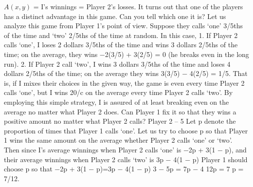 $A(x, y)$ = I’s winnings = Player 2’s losses.
It turns out that one of the players has a distinct advantage in this game. Can you
tell which one it is?
Let us analyze this game from Player 1’s point of view. Suppose they calls ‘one’ 3/5ths
of the time and ‘two’ 2/5ths of the time at random. In this case,
1. If Player 2 calls ‘one’, I loses 2 dollars 3/5ths of the time and wins 3 dollars 2/5ths of the
time; on the average, they wins −2(3/5) + 3(2/5) = 0 (he breaks even in the long run).
2. If Player 2 call ‘two’, I wins 3 dollars 3/5ths of the time and loses 4 dollars 2/5ths of the time;
on the average they wins 3(3/5) − 4(2/5) = 1/5.
That is, if I mixes their choices in the given way, the game is even every time Player 2 calls
‘one’, but I wins 20/c on the average every time Player 2 calls ‘two’. By employing this simple
strategy, I is assured of at least breaking even on the average no matter what Player 2 does. Can
Player 1 fix it so that they wins a positive amount no matter what Player 2 calls?
Player 2 – 5
Let p denote the proportion of times that Player 1 calls ‘one’. Let us try to choose p
so that Player 1 wins the same amount on the average whether Player 2 calls ‘one’ or ‘two’. Then
since I’s average winnings when Player 2 calls ‘one’ is −2p + 3(1 − p), and their average winnings
when Player 2 calls ‘two’ is 3p − 4(1 − p) Player 1 should choose p so that
−2p + 3(1 − p)=3p − 4(1 − p)
3 − 5p = 7p − 4
12p = 7
p = 7/12.
